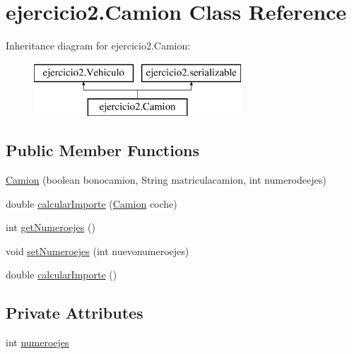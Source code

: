 \hypertarget{classejercicio2_1_1_camion}{}\section{ejercicio2.\+Camion Class Reference}
\label{classejercicio2_1_1_camion}
Inheritance diagram for ejercicio2.\+Camion\+:\begin{figure}[H]
\begin{center}
\leavevmode
\includegraphics[height=2.000000cm]{classejercicio2_1_1_camion}
\end{center}
\end{figure}
\subsection*{Public Member Functions}
\begin{DoxyCompactItemize}
\item 
\mbox{\hyperlink{classejercicio2_1_1_camion_a4bb6c2a4354fa219d24b61efedef7e1d}{Camion}} (boolean bonocamion, String matriculacamion, int numerodeejes)
\item 
double \mbox{\hyperlink{classejercicio2_1_1_camion_ad182c3e62eaf039f0228bf8c7449da2e}{calcular\+Importe}} (\mbox{\hyperlink{classejercicio2_1_1_camion}{Camion}} coche)
\item 
int \mbox{\hyperlink{classejercicio2_1_1_camion_acd892291ca5a4276973799bfd07dcd38}{get\+Numeroejes}} ()
\item 
void \mbox{\hyperlink{classejercicio2_1_1_camion_a5ebe5eaea3ed9c68de9cffe88c2f05b2}{set\+Numeroejes}} (int nuevonumeroejes)
\item 
double \mbox{\hyperlink{classejercicio2_1_1_camion_a99d3e7a5a9433e553bac3386f196bc9b}{calcular\+Importe}} ()
\end{DoxyCompactItemize}
\subsection*{Private Attributes}
\begin{DoxyCompactItemize}
\item 
int \mbox{\hyperlink{classejercicio2_1_1_camion_a212debf109984d9e6d453a0370bbad13}{numeroejes}}
\end{DoxyCompactItemize}


